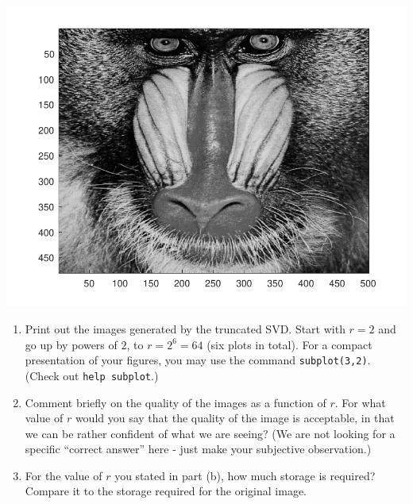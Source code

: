 \documentclass[11pt]{article}
\begin{document}
\begin{enumerate}
\begin{center}
\includegraphics{mandrill2.pdf}
\end{center}

\begin{enumerate}
\item
Print out
the images generated by the truncated SVD. Start
with $r=2$ and go up by powers of $2$, to $r=2^6=64$ (six plots in total). For a compact
presentation of your figures, you may use the command
{\tt subplot(3,2)}. (Check out {\tt help subplot}.)

\item Comment briefly on the quality of the images as a function of $r$. For what value of $r$ would you say that the quality of the image is acceptable, in that we can be rather confident of what we are seeing? (We are not looking for a specific ``correct answer'' here - just make your subjective observation.)
\item For the value of $r$ you stated in part (b), how much storage is required? Compare it to the storage required for the original image.
\end{enumerate}


\end{enumerate}
\end{document}
